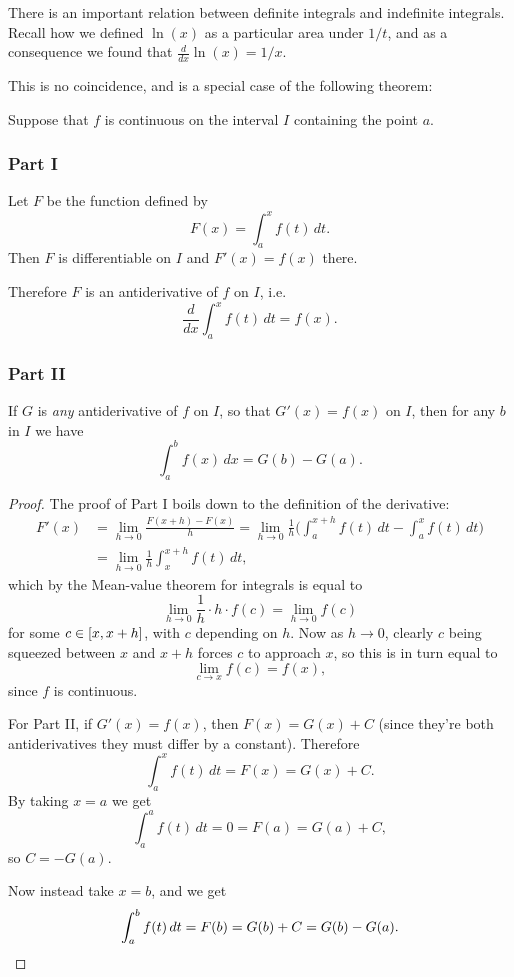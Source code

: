 
There is an important relation between definite integrals and indefinite integrals.
Recall how we defined $\ln(x)$ as a particular area under $1/t$, and as a consequence we found that $\frac{d}{d x} \ln(x) = 1/x$.

This is no coincidence, and is a special case of the following theorem:

\begin{theorem}
	Suppose that $f$ is continuous on the interval $I$ containing the point $a$.

	\subsubsection*{Part I}

	Let $F$ be the function defined by
	\[
		F(x) = \int_a^x f(t) \, d t.
	\]
	Then $F$ is differentiable on $I$ and $F'(x) = f(x)$ there.

	Therefore $F$ is an antiderivative of $f$ on $I$, i.e.
	\[
		\frac{d}{d x} \int_a^x f(t) \, d t = f(x).
	\]

	\subsubsection*{Part II}

	If $G$ is \emph{any} antiderivative of $f$ on $I$, so that $G'(x) = f(x)$ on $I$, then for any $b$ in $I$ we have
	\[
		\int_a^b f(x) \, d x = G(b) - G(a).
	\]
\end{theorem}

\begin{proof}
	The proof of Part I boils down to the definition of the derivative:
	\begin{align*}
		F'(x) & = \lim_{h \to 0} \frac{F(x + h) - F(x)}{h} = \lim_{h \to 0} \frac{1}{h} \Big ( \int_a^{x + h} f(t) \, d t - \int_a^x f(t) \, d t \Big ) \\
		      & = \lim_{h \to 0} \frac{1}{h} \int_x^{x + h} f(t) \, d t,
	\end{align*}
	which by the Mean-value theorem for integrals is equal to
	\[
		\lim_{h \to 0} \frac{1}{h} \cdot h \cdot f(c) = \lim_{h \to 0} f(c)
	\]
	for some $c \in \interval{x}{x+h}$, with $c$ depending on $h$.
	Now as $h \to 0$, clearly $c$ being squeezed between $x$ and $x + h$ forces $c$ to approach $x$, so this is in turn equal to
	\[
		\lim_{c \to x} f(c) = f(x),
	\]
	since $f$ is continuous.

	For Part II, if $G'(x) = f(x)$, then $F(x) = G(x) + C$ (since they're both antiderivatives they must differ by a constant).
	Therefore
	\[
		\int_a^x f(t) \, d t = F(x) = G(x) + C.
	\]
	By taking $x = a$ we get
	\[
		\int_a^a f(t) \, d t = 0 = F(a) = G(a) + C,
	\]
	so $C = - G(a)$.

	Now instead take $x = b$, and we get
	\[
		\int_a^b f(t) \, d t = F(b) = G(b) + C = G(b) - G(a). \qedhere
	\]
\end{proof}

